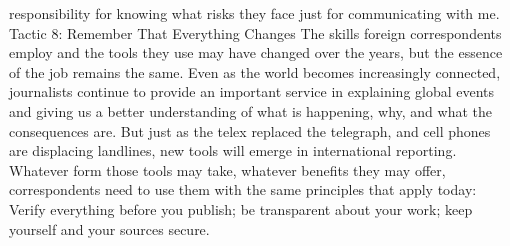 responsibility for knowing what risks they face just for communicating with me.
Tactic 8: Remember That Everything Changes
The skills foreign correspondents employ and the tools they use may have changed over
the years, but the essence of the job remains the same. Even as the world becomes
increasingly connected, journalists continue to provide an important service in explaining
global events and giving us a better understanding of what is happening, why, and what
the consequences are.
But just as the telex replaced the telegraph, and cell phones are displacing landlines, new
tools will emerge in international reporting. Whatever form those tools may take,
whatever benefits they may offer, correspondents need to use them with the same
principles that apply today: Verify everything before you publish; be transparent about
your work; keep yourself and your sources secure.
